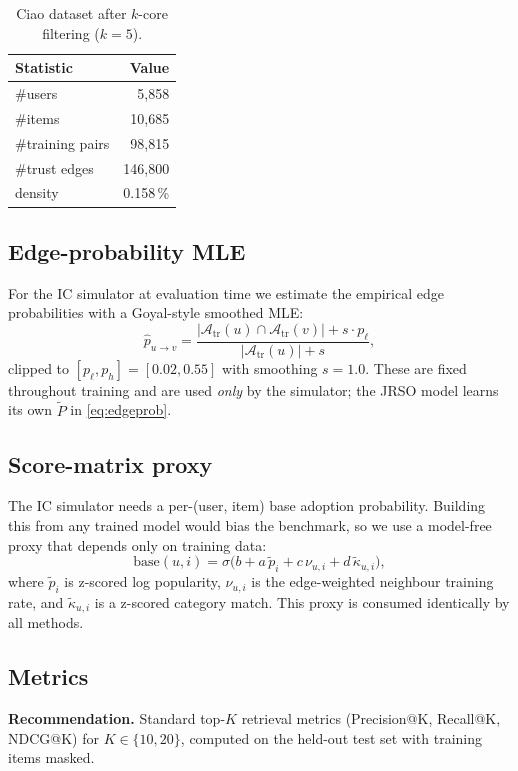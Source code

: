 \documentclass[conference]{IEEEtran}
\begin{document}
\begin{table}[t]
\centering
\caption{Ciao dataset after $k$-core filtering ($k\!=\!5$).}
\label{tab:datastats}
\begin{tabular}{lr}
\toprule
\textbf{Statistic} & \textbf{Value} \\
\midrule
\#users           & 5{,}858 \\
\#items           & 10{,}685 \\
\#training pairs  & 98{,}815 \\
\#trust edges     & 146{,}800 \\
density           & 0.158\,\% \\
\bottomrule
\end{tabular}
\end{table}

\subsection{Edge-probability MLE}
For the IC simulator at evaluation time we estimate the empirical edge
probabilities with a Goyal-style smoothed MLE:
\[
\hat p_{u\to v}=\frac{|\mathcal A_{\text{tr}}(u)\cap\mathcal A_{\text{tr}}(v)|+s\cdot p_\ell}{|\mathcal A_{\text{tr}}(u)|+s},
\]
clipped to $[p_\ell,p_h]=[0.02,0.55]$ with smoothing $s=1.0$. These are
fixed throughout training and are used \emph{only} by the simulator;
the JRSO model learns its own $\widetilde P$ in \eqref{eq:edgeprob}.

\subsection{Score-matrix proxy}
The IC simulator needs a per-(user, item) base adoption probability.
Building this from any trained model would bias the benchmark, so we
use a model-free proxy that depends only on training data:
\[
\mathrm{base}(u,i)=\sigma\!\bigl(b+a\,\widetilde{p}_i+c\,\nu_{u,i}+d\,\widetilde\kappa_{u,i}\bigr),
\]
where $\widetilde p_i$ is z-scored log popularity, $\nu_{u,i}$ is the
edge-weighted neighbour training rate, and $\widetilde\kappa_{u,i}$ is a
z-scored category match. This proxy is consumed identically by all
methods.

\subsection{Metrics}
\textbf{Recommendation.} Standard top-$K$ retrieval metrics
(Precision@K, Recall@K, NDCG@K) for $K\!\in\!\{10,20\}$, computed on
the held-out test set with training items masked.
\end{document}
